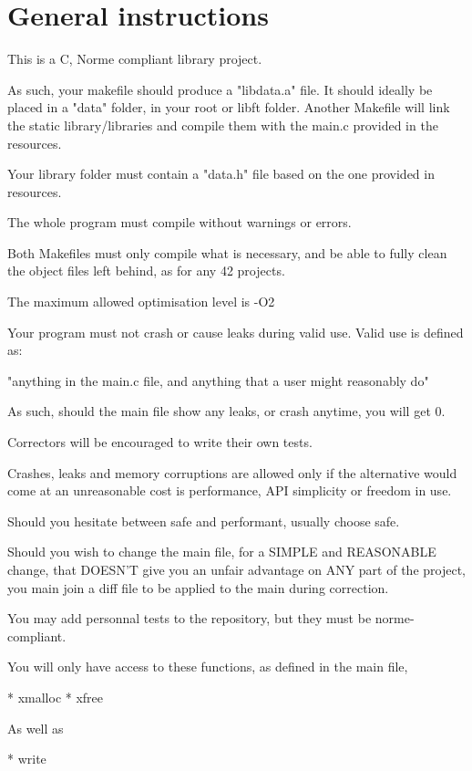 \documentclass{42-en}
\begin{document}
\chapter{General instructions}

    This is a C, Norme compliant library project.

    As such, your makefile should produce a "libdata.a" file. It should ideally be placed in a "data"
    folder, in your root or libft folder. Another Makefile will link the static library/libraries and compile them
    with the main.c provided in the resources.

    Your library folder must contain a "data.h" file based on the one provided in resources.

    The whole program must compile without warnings or errors.

    Both Makefiles must only compile what is necessary, and be able to fully clean the object files left behind,
    as for any 42 projects.

    The maximum allowed optimisation level is -O2

    Your program must not crash or cause leaks during valid use. Valid use is defined as:

    "anything in the main.c file, and anything that a user might reasonably do"

    As such, should the main file show any leaks, or crash anytime, you will get 0.

    Correctors will be encouraged to write their own tests.

    Crashes, leaks and memory corruptions are allowed only if the alternative would come at
    an unreasonable cost is performance, API simplicity or freedom in use.

    Should you hesitate between safe and performant, usually choose safe.

    Should you wish to change the main file, for a SIMPLE and REASONABLE change,
    that DOESN'T give you an unfair advantage on ANY part of the project, you main join a diff
    file to be applied to the main during correction.

    You may add personnal tests to the repository, but they must be norme-compliant. 

    You will only have access to these functions, as defined in the main file,

        * xmalloc
        * xfree
    
    As well as

        * write
\end{document}
